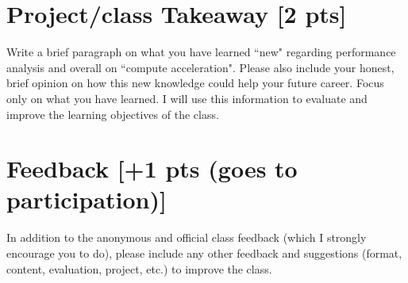 \documentclass[sigconf,authorversion,nonacm]{acmart}
\begin{document}
\section{Project/class Takeaway {\small {[2 pts]}}}  
Write a brief paragraph on what you have learned ``new" regarding performance analysis and overall on ``compute acceleration". Please also include your honest, brief opinion on how this new knowledge could help your future career. Focus only on what you have learned. I will use this information to evaluate and improve the learning objectives of the class. 


\section{Feedback {\small {[+1 pts (goes to participation)]}}}  
In addition to the anonymous and official class feedback (which I strongly encourage you to do), please include any other feedback and suggestions (format, content, evaluation, project, etc.) to improve the class.




\end{document}
